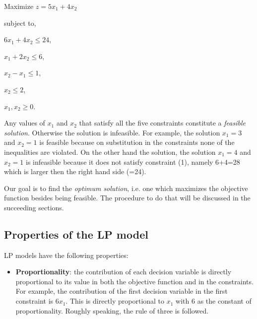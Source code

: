 Maximize $z = 5x _1+4x _2$



subject to,



$6x _1+4x _2\le 24$,



$x _1+2x _2\le 6$,



$x _2-x _1\le 1$,



$x _2\le 2$,



$x _1,x _2\ge 0$.



Any values of $x _1$ and $x _2$ that satisfy all the five constraints constitute a
\textit{feasible solution}. Otherwise the solution is infeasible. For example, the
solution $x _1=3$ and $x _2=1$ is feasible because on substitution in the constraints none
of the inequalities are violated. On the other hand the solution, the solution $x _1=4$
and $x _2=1$ is infeasible because it does not satisfy constraint (1), namely 6+4=28
which is larger then the right hand side (=24).



Our goal is to find the \textit{optimum solution}, i.e. one which maximizes the objective
function besides being feasible. The procedure to do that will be discussed in the
succeeding sections.




\subsection{Properties of the LP model}
\label{sss:prop-ae2a}




LP models have the following properties:



\begin{itemize}
    \item \textbf{Proportionality}: the contribution of each decision variable is directly proportional to its value in both the objective function and in the constraints. For example, the contribution of the first decision variable in the first constraint is $6x _1$. This is directly proportional to $x _1$ with 6 as the constant of proportionality. Roughly speaking, the rule of three is followed.
\end{itemize}

